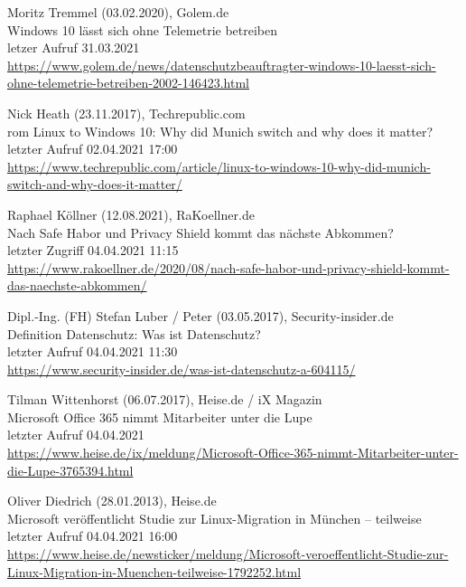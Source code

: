 \begin{thebibliography}{9}
    \bibitem{}
        Moritz Tremmel (03.02.2020), Golem.de
        \\Windows 10 lässt sich ohne Telemetrie betreiben
        \\letzer Aufruf 31.03.2021
        \\\url{https://www.golem.de/news/datenschutzbeauftragter-windows-10-laesst-sich-ohne-telemetrie-betreiben-2002-146423.html}

    \bibitem{}
        Nick Heath (23.11.2017), Techrepublic.com
        \\rom Linux to Windows 10: Why did Munich switch and why does it matter?
        \\letzter Aufruf 02.04.2021 17:00
        \\\url{https://www.techrepublic.com/article/linux-to-windows-10-why-did-munich-switch-and-why-does-it-matter/}

    \bibitem{}
        Raphael Köllner (12.08.2021), RaKoellner.de
        \\Nach Safe Habor und Privacy Shield kommt das nächste Abkommen?
        \\letzter Zugriff 04.04.2021 11:15
        \\\url{https://www.rakoellner.de/2020/08/nach-safe-habor-und-privacy-shield-kommt-das-naechste-abkommen/}

    \bibitem{}
        Dipl.-Ing. (FH) Stefan Luber / Peter (03.05.2017), Security-insider.de
        \\Definition Datenschutz: Was ist Datenschutz?
        \\letzter Aufruf 04.04.2021 11:30
        \\\url{https://www.security-insider.de/was-ist-datenschutz-a-604115/}
    \pagebreak

    \bibitem{}
        Tilman Wittenhorst (06.07.2017), Heise.de / iX Magazin
        \\Microsoft Office 365 nimmt Mitarbeiter unter die Lupe
        \\letzter Aufruf 04.04.2021
        \\\url{https://www.heise.de/ix/meldung/Microsoft-Office-365-nimmt-Mitarbeiter-unter-die-Lupe-3765394.html}

    \bibitem{}
        Oliver Diedrich (28.01.2013), Heise.de
        \\Microsoft veröffentlicht Studie zur Linux-Migration in München – teilweise
        \\letzter Aufruf 04.04.2021 16:00
        \\\url{https://www.heise.de/newsticker/meldung/Microsoft-veroeffentlicht-Studie-zur-Linux-Migration-in-Muenchen-teilweise-1792252.html}

\end{thebibliography}